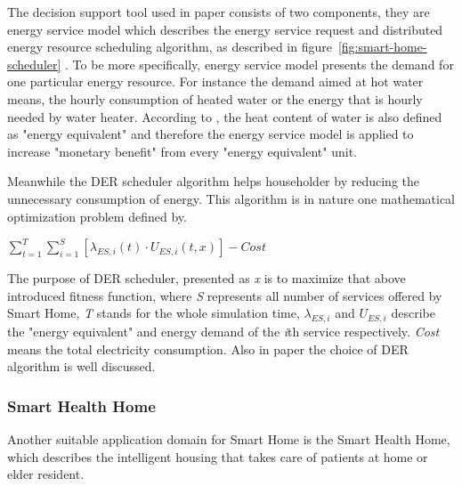 \documentclass[]{llncs}
\begin{document}
The decision support tool used in paper\cite{smart_home_for_energy} consists of two components, they are energy service model which describes the energy service request and distributed energy resource scheduling algorithm, as described in figure~\ref{fig:smart-home-scheduler} . To be more specifically, energy service model presents  the demand for one particular energy resource. For instance the demand aimed at hot water means, the hourly consumption of heated water or the energy that is hourly needed by water heater.  According to \cite{smart_home_for_energy}, the heat content of water is also defined as "energy equivalent" and therefore the energy service model is applied to increase "monetary benefit"  from every "energy equivalent" unit.

Meanwhile the DER scheduler algorithm helps householder by reducing the unnecessary consumption of energy. This algorithm is in nature one mathematical optimization problem defined by\cite{smart_home_for_energy}.
\begin{center}
 $ \sum_{t=1}^{T}\sum_{i=1}^{S}[\lambda_{ES,i}(t)\cdot {U_{ES,i}}(t,x)]-Cost$
\end{center}

The purpose of DER scheduler, presented as \emph{x} is to maximize that above introduced fitness function, where \emph{S} represents all number of services offered by Smart Home, \emph{T} stands for the whole simulation time, $\lambda_{ES,i}$ and $ U_{ES,i}$ describe the "energy equivalent"  and energy demand of the \emph{i}th service respectively. \emph{Cost} means the total electricity consumption. Also in paper\cite{smart_home_for_energy} the choice of DER algorithm is well discussed.


\subsubsection{Smart Health Home}
Another suitable application domain for Smart Home is the Smart Health Home, which describes the intelligent housing that takes care of patients at home or elder resident.
\end{document}
